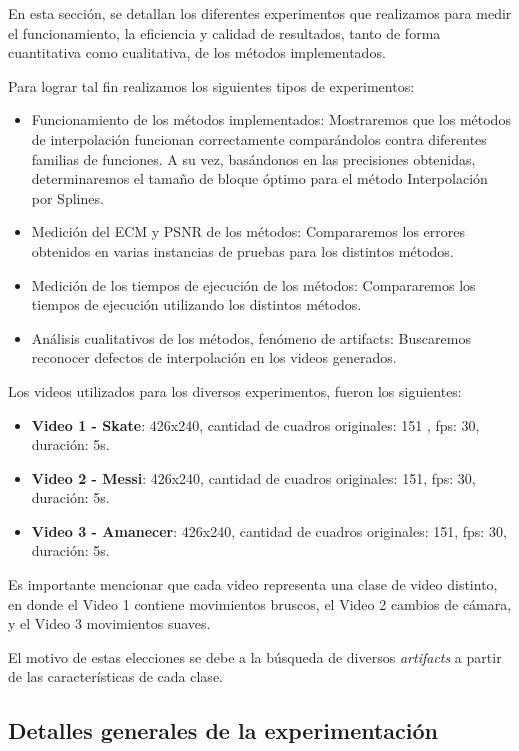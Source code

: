 En esta sección, se detallan los diferentes experimentos que realizamos para medir el funcionamiento, la eficiencia y calidad de resultados, tanto de forma cuantitativa como cualitativa, de los métodos implementados.

Para lograr tal fin realizamos los siguientes tipos de experimentos:
\begin{itemize}
  \item Funcionamiento de los métodos implementados: Mostraremos que los métodos
        de interpolación funcionan correctamente comparándolos contra diferentes
        familias de funciones. A su vez, basándonos en las precisiones obtenidas,
        determinaremos el tamaño de bloque óptimo para el método Interpolación por Splines.
  \item Medición del ECM y PSNR de los métodos: Compararemos los errores obtenidos
        en varias instancias de pruebas para los distintos métodos.
  \item Medición de los tiempos de ejecución de los métodos: Compararemos los
        tiempos de ejecución utilizando los distintos métodos.
  \item Análisis cualitativos de los métodos, fenómeno de artifacts: Buscaremos
        reconocer defectos de interpolación en los videos generados.
\end{itemize}

Los videos utilizados para los diversos experimentos, fueron los siguientes:

\begin{itemize}
  \item \textbf{Video 1 - Skate}: 426x240, cantidad de cuadros originales: 151 , fps: 30, duración: 5s.
  \item \textbf{Video 2 - Messi}: 426x240, cantidad de cuadros originales: 151, fps: 30, duración: 5s.
  \item \textbf{Video 3 - Amanecer}: 426x240, cantidad de cuadros originales: 151, fps: 30, duración: 5s.
\end{itemize}

Es importante mencionar que cada video representa una clase de video distinto, en donde el Video 1 contiene movimientos bruscos, el Video 2 cambios de cámara, y el Video 3 movimientos suaves.

El motivo de estas elecciones se debe a la búsqueda de diversos \textit{artifacts} a partir de las características de cada clase.

\subsection{Detalles generales de la experimentación}

